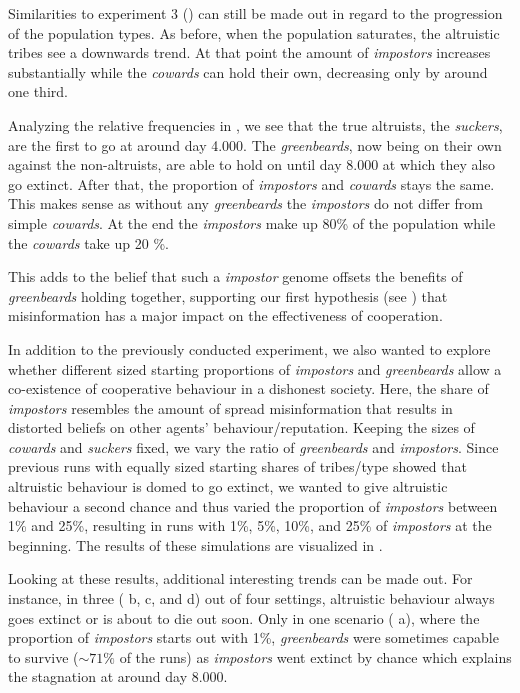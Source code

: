 \documentclass[sigconf]{acmart}
\newcommand{\cowards}{\textit{cowards}\xspace}
\newcommand{\suckers}{\textit{suckers}\xspace}
\newcommand{\impostors}{\textit{impostors}\xspace}
\newcommand{\impostor}{\textit{impostor}\xspace}
\newcommand{\greenbeards}{\textit{greenbeards}\xspace}
\begin{document}
    Similarities to experiment 3 () can still be made out in regard to the progression of the population types.
    As before, when the population saturates, the altruistic tribes see a downwards trend.
    At that point the amount of \impostors increases substantially while the \cowards can hold their own, decreasing only by around one third.

    Analyzing the relative frequencies in , we see that the true altruists, the \suckers, are the first to go at around day 4.000.
    The \greenbeards, now being on their own against the non-altruists, are able to hold on until day 8.000 at which they also go extinct.
    After that, the proportion of \impostors and \cowards stays the same.
    This makes sense as without any \greenbeards the \impostors do not differ from simple \cowards.
    At the end the \impostors make up 80\% of the population while the \cowards take up 20 \%.

    This adds to the belief that such a \impostor genome offsets the benefits of \greenbeards holding together, supporting our first hypothesis (see ) that misinformation has a major impact on the effectiveness of cooperation.

    In addition to the previously conducted experiment, we also wanted to explore whether different sized starting proportions of \impostors and \greenbeards allow a co-existence of cooperative behaviour in a dishonest society.
    Here, the share of \impostors resembles the amount of spread misinformation that results in distorted beliefs on other agents' behaviour/reputation.
    Keeping the sizes of \cowards and \suckers fixed, we vary the ratio of \greenbeards and \impostors.
    Since previous runs with equally sized starting shares of tribes/type showed that altruistic behaviour is domed to go extinct, we wanted to give altruistic behaviour a second chance and thus varied the proportion of \impostors between 1\% and 25\%, resulting in runs with 1\%, 5\%, 10\%, and 25\% of \impostors at the beginning.
    The results of these simulations are visualized in .

    Looking at these results, additional interesting trends can be made out.
    For instance, in three ( b, c, and d) out of four settings, altruistic behaviour always goes extinct or is about to die out soon.
    Only in one scenario ( a), where the proportion of \impostors starts out with 1\%, \greenbeards were sometimes capable to survive ($\sim 71\%$ of the runs) as \impostors went extinct by chance which explains the stagnation at around day 8.000.
\end{document}
